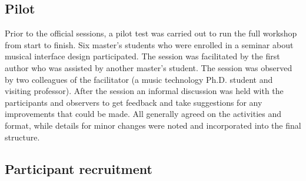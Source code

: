 \documentclass[letterpaper, 12pt]{article}
\begin{document}
\subsection{Pilot}
\label{ch3-sec:pilot}

Prior to the official sessions, a pilot test was carried out to run the full workshop from start to finish. Six master's students who were enrolled in a seminar about musical interface design participated. The session was facilitated by the first author who was assisted by another master's student.
The session was observed by two colleagues of the facilitator (a music technology Ph.D. student and visiting professor). After the session an informal discussion was held with the participants and observers to get feedback and take suggestions for any improvements that could be made. All generally agreed on the activities and format, while details for minor changes were noted and incorporated into the final structure.  


\subsection{Participant recruitment}
\label{ch3-sec:participant-criteria-and-selection}

\end{document}
